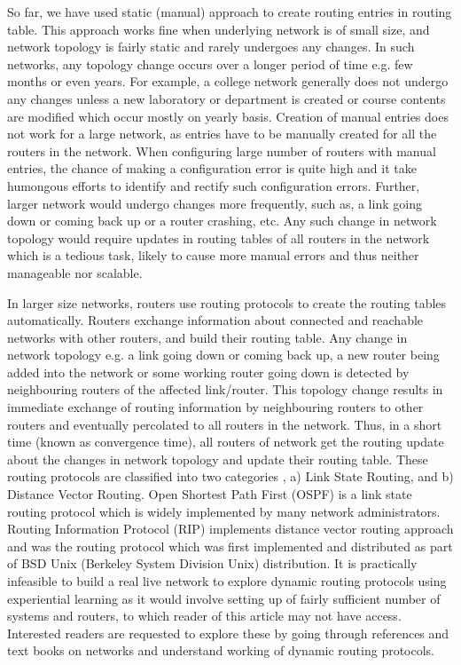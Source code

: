 \begin{multicols}{2}
So far, we have used static (manual) approach to create routing entries in routing table. This approach works fine when underlying network is of small size, and network topology is fairly static and rarely undergoes any changes. In such networks, any topology change occurs over a longer period of time e.g. few months or even years. For example, a college network generally does not undergo any changes unless a new laboratory or department is created or course contents are modified which occur mostly on yearly basis. Creation of manual entries does not work for a large network, as entries have to be manually created for all the routers in the network.  When configuring large number of routers with manual entries, the chance of making a configuration error is quite high and it take humongous efforts to identify and rectify such configuration errors. Further, larger network would undergo changes more frequently, such as, a link going down or coming back up or a router crashing, etc.  Any such change in network topology would require updates in routing tables of all routers in the network which is a tedious task, likely to cause more manual errors and thus neither manageable nor scalable.


In larger size networks, routers use routing protocols to create the routing tables automatically. Routers exchange information about connected and reachable networks with other routers, and build their routing table. Any change in network topology e.g. a link going down or coming back up, a new router being added into the network or some working router going down is detected by neighbouring routers of the affected link/router. This topology change results in immediate exchange of routing information by neighbouring routers to other routers and eventually percolated to all routers in the network. Thus, in a short time (known as convergence time), all routers of network get the routing update about the changes in network topology and update their routing table. These routing protocols are classified into two categories  \cite{art2-key10}, a) Link State Routing, and b) Distance Vector Routing. Open Shortest Path First (OSPF)\cite{art2-key04} is a link state routing protocol which is widely implemented by many network administrators. Routing Information Protocol (RIP) \cite{art2-key05}\cite{art2-key06} implements distance vector routing approach and was the routing protocol which was first implemented and distributed as part of BSD Unix (Berkeley System Division Unix) distribution. It is practically infeasible to build a real live network to explore dynamic routing protocols using experiential learning as it would involve setting up of fairly sufficient number of systems and routers, to which reader of this article may not have access. Interested readers are requested to explore these by going through references and text books on networks and understand working of dynamic routing protocols.


\end{multicols}
